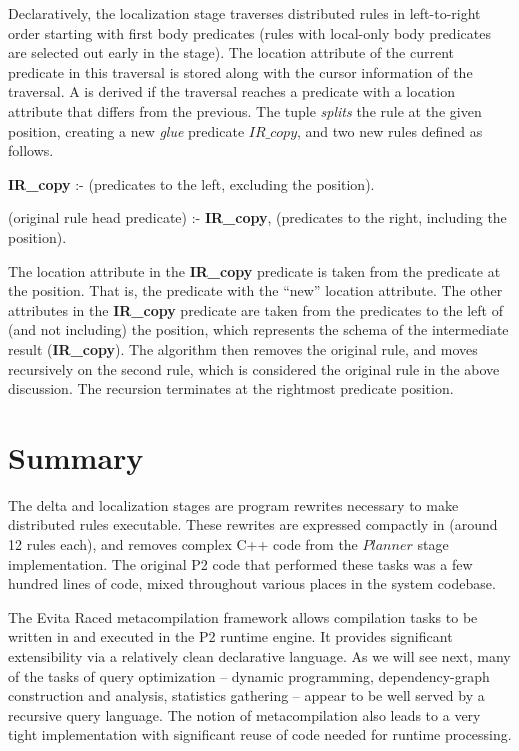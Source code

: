 Declaratively, the localization stage traverses distributed rules in
left-to-right order starting with first body predicates (rules with local-only
body predicates are selected out early in the stage).  The location attribute
of the current predicate in this traversal is stored along with the cursor
information of the traversal.  A  is derived if the traversal
reaches a predicate with a location attribute that differs from the previous.
The  tuple {\em splits} the rule at the given position, creating
a new {\em glue} predicate $IR\_copy$, and two new rules defined as follows.
\begin{CompactEnumerate} 
\item {\bf IR\_copy} :- (predicates to the left, excluding the  position).  
\item (original rule head predicate) :- {\bf IR\_copy}, (predicates to the right, including
  the  position).  
\end{CompactEnumerate} 
The location attribute in the {\bf IR\_copy} predicate is taken from the
predicate at the  position.  That is, the predicate with the
``new'' location attribute.  The other attributes in the {\bf IR\_copy}
predicate are taken from the predicates to the left of (and not including) the
 position, which represents the schema of the intermediate result
({\bf IR\_copy}).  The algorithm then removes the original rule, and moves
recursively on the second rule, which is considered the original rule in the
above discussion.  The recursion terminates at the rightmost predicate
position.

\section{Summary} 
\label{ch:evita:sec:summary} 

The delta and localization stages are program rewrites necessary to make
distributed rules executable.  These rewrites are expressed compactly in
\OVERLOG (around 12 rules each), and removes complex C++ code from the
$Planner$ stage implementation.  The original P2 code that performed these
tasks was a few hundred lines of code, mixed throughout various places in the
system codebase.

The Evita Raced metacompilation framework allows \OVERLOG compilation tasks to
be written in \OVERLOG and executed in the P2 runtime engine.  It provides
significant extensibility via a relatively clean declarative language.  As we
will see next, many of the tasks of query optimization -- dynamic programming,
dependency-graph construction and analysis, statistics gathering -- appear to
be well served by a recursive query language.  The notion of metacompilation
also leads to a very tight implementation with significant reuse of code needed
for runtime processing.

